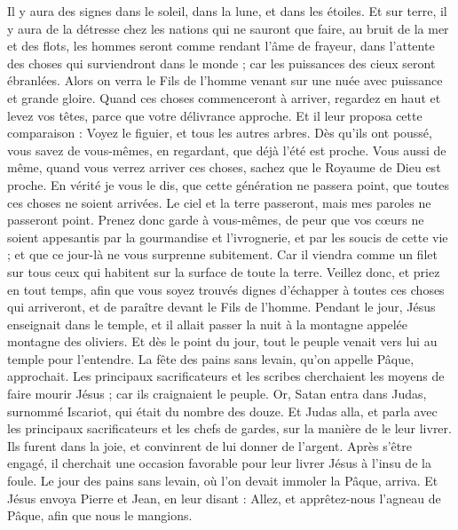 \begin{multicols}{2}
{Il y aura des signes dans le soleil, dans la lune, et dans les étoiles. Et sur terre, il y aura de la détresse chez les nations qui ne sauront que faire, au bruit de la mer et des flots,
les hommes seront comme rendant l'âme de frayeur, dans l'attente des choses qui surviendront dans le monde ; car les puissances des cieux seront ébranlées.
Alors on verra le Fils de l'homme venant sur une nuée avec puissance et grande gloire.
Quand ces choses commenceront à arriver, regardez en haut et levez vos têtes, parce que votre délivrance approche.
Et il leur proposa cette comparaison : Voyez le figuier, et tous les autres arbres.
Dès qu’ils ont poussé, vous savez de vous-mêmes, en regardant, que déjà l’été est proche.
Vous aussi de même, quand vous verrez arriver ces choses, sachez que le Royaume de Dieu est proche.
En vérité je vous le dis, que cette génération ne passera point, que toutes ces choses ne soient arrivées.
Le ciel et la terre passeront, mais mes paroles ne passeront point.
Prenez donc garde à vous-mêmes, de peur que vos cœurs ne soient appesantis par la gourmandise et l'ivrognerie, et par les soucis de cette vie ; et que ce jour-là ne vous surprenne subitement.
Car il viendra comme un filet sur tous ceux qui habitent sur la surface de toute la terre.
Veillez donc, et priez en tout temps, afin que vous soyez trouvés dignes d’échapper à toutes ces choses qui arriveront, et de paraître devant le Fils de l'homme.
Pendant le jour, Jésus enseignait dans le temple, et il allait passer la nuit à la montagne appelée montagne des oliviers.
Et dès le point du jour, tout le peuple venait vers lui au temple pour l'entendre.
\VerseOne{}La fête des pains sans levain, qu'on appelle Pâque, approchait.
Les principaux sacrificateurs et les scribes cherchaient les moyens de faire mourir Jésus ; car ils craignaient le peuple.
Or, Satan entra dans Judas, surnommé Iscariot, qui était du nombre des douze.
Et Judas alla, et parla avec les principaux sacrificateurs et les chefs de gardes, sur la manière de le leur livrer.
Ils furent dans la joie, et convinrent de lui donner de l'argent.
Après s’être engagé, il cherchait une occasion favorable pour leur livrer Jésus à l’insu de la foule.
\TextTitle{[La pâque]}
Le jour des pains sans levain, où l’on devait immoler la Pâque, arriva.
Et Jésus envoya Pierre et Jean, en leur disant : Allez, et apprêtez-nous l'agneau de Pâque, afin que nous le mangions.
}
\end{multicols}
